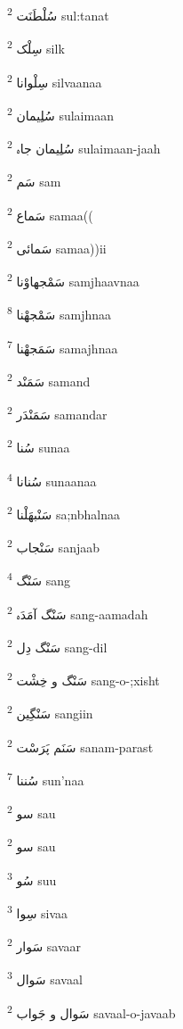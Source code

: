 \documentclass[12pt]{article}
\begin{document}
\begin{multicols}{5}
{\ur سُلْطَنَت}   \textsuperscript{2} sul:tanat

{\ur سِلْک}   \textsuperscript{2} silk

{\ur سِلْوانا}   \textsuperscript{2} silvaanaa

{\ur سُلِیمان}   \textsuperscript{2} sulaimaan

{\ur سُلِیمان جاہ}   \textsuperscript{2} sulaimaan-jaah

{\ur سَم}   \textsuperscript{2} sam

{\ur سَماع}   \textsuperscript{2} samaa((

{\ur سَمائی}   \textsuperscript{2} samaa))ii

{\ur سَمْجھاوْنا}   \textsuperscript{2} samjhaavnaa

{\ur سَمْجھْنا}   \textsuperscript{8} samjhnaa

{\ur سَمَجھْنا}   \textsuperscript{7} samajhnaa

{\ur سَمَنْد}   \textsuperscript{2} samand

{\ur سَمَنْدَر}   \textsuperscript{2} samandar

{\ur سُنا}   \textsuperscript{2} sunaa

{\ur سُنانا}   \textsuperscript{4} sunaanaa

{\ur سَنْبھَلْنا}   \textsuperscript{2} sa;nbhalnaa

{\ur سَنْجاب}   \textsuperscript{2} sanjaab

{\ur سَنْگ}   \textsuperscript{4} sang

{\ur سَنْگ آمَدَہ}   \textsuperscript{2} sang-aamadah

{\ur سَنْگ دِل}   \textsuperscript{2} sang-dil

{\ur سَنْگ و خِشْت}   \textsuperscript{2} sang-o-;xisht

{\ur سَنْگِین}   \textsuperscript{2} sangiin

{\ur سَنَم پَرَسْت}   \textsuperscript{2} sanam-parast

{\ur سُننا}   \textsuperscript{7} sun'naa

{\ur سو}   \textsuperscript{2} sau

{\ur سو}   \textsuperscript{2} sau

{\ur سُو}   \textsuperscript{3} suu

{\ur سِوا}   \textsuperscript{3} sivaa

{\ur سَوار}   \textsuperscript{2} savaar

{\ur سَوال}   \textsuperscript{3} savaal

{\ur سَوال و جَواب}   \textsuperscript{2} savaal-o-javaab


\end{multicols}
\end{document}

